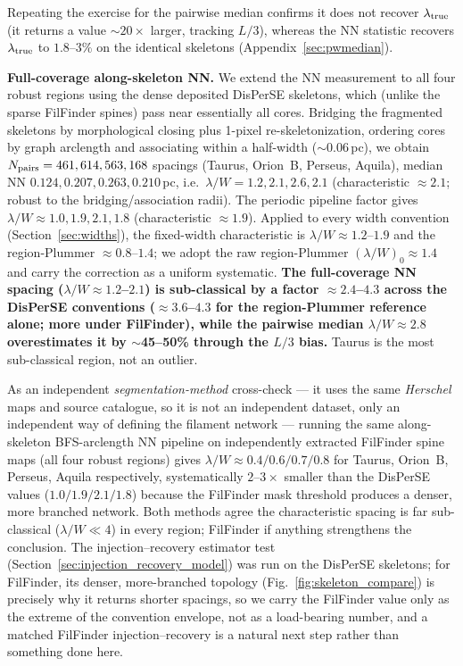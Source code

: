 \documentclass[usenatbib,twoside,twocolumn]{mnras}
\begin{document}
Repeating the exercise for the pairwise median confirms it does not recover $\lambda_{\rm true}$ (it returns a value $\sim$$20\times$ larger, tracking $L/3$), whereas the NN statistic recovers $\lambda_{\rm true}$ to $1.8$--$3\%$ on the identical skeletons (Appendix~\ref{sec:pwmedian}).

\textbf{Full-coverage along-skeleton NN.} We extend the NN measurement to all four robust regions using the dense deposited DisPerSE skeletons, which (unlike the sparse FilFinder spines) pass near essentially all cores. Bridging the fragmented skeletons by morphological closing plus 1-pixel re-skeletonization, ordering cores by graph arclength and associating within a half-width ($\sim$0.06\,pc), we obtain $N_{\rm pairs}=461,614,563,168$ spacings (Taurus, Orion~B, Perseus, Aquila), median NN $0.124,0.207,0.263,0.210$\,pc, i.e.\ $\lambda/W=1.2,2.1,2.6,2.1$ (characteristic $\approx2.1$; robust to the bridging/association radii). The periodic pipeline factor gives $\lambda/W\approx1.0,1.9,2.1,1.8$ (characteristic $\approx1.9$). Applied to every width convention (Section~\ref{sec:widths}), the fixed-width characteristic is $\lambda/W\approx1.2$--$1.9$ and the region-Plummer $\approx0.8$--$1.4$; we adopt the raw region-Plummer $(\lambda/W)_0\approx1.4$ and carry the correction as a uniform systematic. \textbf{The full-coverage NN spacing ($\lambda/W\approx1.2$--$2.1$) is sub-classical by a factor $\approx2.4$--$4.3$ across the DisPerSE conventions ($\approx3.6$--$4.3$ for the region-Plummer reference alone; more under FilFinder), while the pairwise median $\lambda/W\approx2.8$ overestimates it by $\sim$45--50\% through the $L/3$ bias.} Taurus is the most sub-classical region, not an outlier.

As an independent \emph{segmentation-method} cross-check --- it uses the same \textit{Herschel} maps and source catalogue, so it is not an independent dataset, only an independent way of defining the filament network --- running the same along-skeleton BFS-arclength NN pipeline on independently extracted FilFinder spine maps (all four robust regions) gives $\lambda/W\approx0.4/0.6/0.7/0.8$ for Taurus, Orion~B, Perseus, Aquila respectively, systematically $2$--$3\times$ smaller than the DisPerSE values ($1.0/1.9/2.1/1.8$) because the FilFinder mask threshold produces a denser, more branched network. Both methods agree the characteristic spacing is far sub-classical ($\lambda/W\ll4$) in every region; FilFinder if anything strengthens the conclusion. The injection--recovery estimator test (Section~\ref{sec:injection_recovery_model}) was run on the DisPerSE skeletons; for FilFinder, its denser, more-branched topology (Fig.~\ref{fig:skeleton_compare}) is precisely why it returns shorter spacings, so we carry the FilFinder value only as the extreme of the convention envelope, not as a load-bearing number, and a matched FilFinder injection--recovery is a natural next step rather than something done here.
\end{document}
